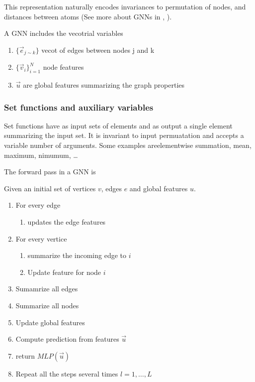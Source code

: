 \documentclass[b5paper]{report}
\begin{document}
This representation naturally encodes invariances to permutation of nodes, and
distances between atoms (See more about GNNs in \cite{scarselli2009graph},
\cite{li2018learning}).

A GNN includes the vecotrial variables

\begin{enumerate}
  \item $\{\vec{e}_{j\sim k}\}$ vecot of edges between nodes j and k
  \item $\{\vec{v}_i\}_{i=1}^N$ node features
  \item $\vec{u}$ are global features summarizing the graph properties
\end{enumerate}

\subsubsection{Set functions and auxiliary variables}

Set functions have as input sets of elements and as output a single element
summarizing the input set. It is invariant to input permuatation and accepts a
variable number of arguments. Some examples areelementwise summation, mean,
maximum, nimumum, \dots

The forward pass in a GNN is

Given an initial set of vertices $v$, edges $e$ and global features $u$.

\begin{enumerate}
  \item For every edge
    \begin{enumerate}
      \item  updates the edge features
    \end{enumerate}
  \item For every vertice
    \begin{enumerate}
      \item summarize the incoming edge to $i$
      \item Update feature for node $i$
    \end{enumerate}
  \item Sumamrize all edges
  \item Summarize all nodes
  \item Update global features
  \item Compute prediction from features $\vec{u}$
  \item return $MLP(\vec{u})$
  \item Repeat all the steps several times $l=1,\dots,L$
\end{enumerate}
\end{document}
